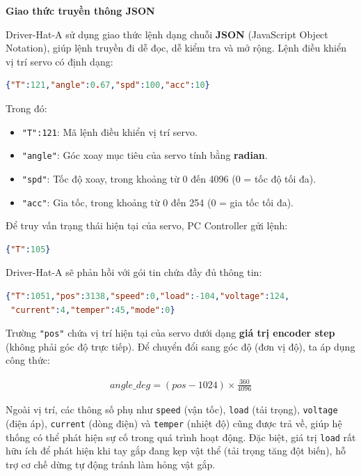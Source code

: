 \textbf{Giao thức truyền thông JSON}

Driver-Hat-A sử dụng giao thức lệnh dạng chuỗi \textbf{JSON} (JavaScript Object Notation), giúp lệnh truyền đi dễ đọc, dễ kiểm tra và mở rộng. Lệnh điều khiển vị trí servo có định dạng:

\begin{lstlisting}[language=json]
{"T":121,"angle":0.67,"spd":100,"acc":10}
\end{lstlisting}

Trong đó:
\begin{itemize}
    \item \lstinline[style=inlinecode]{"T":121}: Mã lệnh điều khiển vị trí servo.
    \item \lstinline[style=inlinecode]{"angle"}: Góc xoay mục tiêu của servo tính bằng \textbf{radian}.
    \item \lstinline[style=inlinecode]{"spd"}: Tốc độ xoay, trong khoảng từ 0 đến 4096 (0 = tốc độ tối đa).
    \item \lstinline[style=inlinecode]{"acc"}: Gia tốc, trong khoảng từ 0 đến 254 (0 = gia tốc tối đa).
\end{itemize}

Để truy vấn trạng thái hiện tại của servo, PC Controller gửi lệnh:
\begin{lstlisting}[language=json]
{"T":105}
\end{lstlisting}

Driver-Hat-A sẽ phản hồi với gói tin chứa đầy đủ thông tin:
\begin{lstlisting}[language=json]
{"T":1051,"pos":3138,"speed":0,"load":-104,"voltage":124,
 "current":4,"temper":45,"mode":0}
\end{lstlisting}

Trường \lstinline[style=inlinecode]{"pos"} chứa vị trí hiện tại của servo dưới dạng \textbf{giá trị encoder step} (không phải góc độ trực tiếp). Để chuyển đổi sang góc độ (đơn vị độ), ta áp dụng công thức:

\begin{align*}
angle\_deg = (pos - 1024) \times \frac{360}{4096}
\end{align*}

Ngoài vị trí, các thông số phụ như \lstinline[style=inlinecode]{speed} (vận tốc), \lstinline[style=inlinecode]{load} (tải trọng), \lstinline[style=inlinecode]{voltage} (điện áp), \lstinline[style=inlinecode]{current} (dòng điện) và \lstinline[style=inlinecode]{temper} (nhiệt độ) cũng được trả về, giúp hệ thống có thể phát hiện sự cố trong quá trình hoạt động. Đặc biệt, giá trị \lstinline[style=inlinecode]{load} rất hữu ích để phát hiện khi tay gắp đang kẹp vật thể (tải trọng tăng đột biến), hỗ trợ cơ chế dừng tự động tránh làm hỏng vật gắp.


